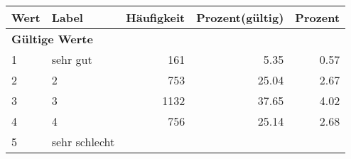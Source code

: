      \begin{longtable}{lXrrr}
     \toprule
     \textbf{Wert} & \textbf{Label} & \textbf{Häufigkeit} & \textbf{Prozent(gültig)} & \textbf{Prozent} \\
     \endhead
     \midrule
     \multicolumn{5}{l}{\textbf{Gültige Werte}}\\

     1 &
     \multicolumn{1}{X}{ sehr gut   } &


       \num{161} &
       \num[round-mode=places,round-precision=2]{5,35} &
         \num[round-mode=places,round-precision=2]{0,57} \\

     2 &
     \multicolumn{1}{X}{ 2   } &


       \num{753} &
       \num[round-mode=places,round-precision=2]{25,04} &
         \num[round-mode=places,round-precision=2]{2,67} \\

     3 &
     \multicolumn{1}{X}{ 3   } &


       \num{1132} &
       \num[round-mode=places,round-precision=2]{37,65} &
         \num[round-mode=places,round-precision=2]{4,02} \\

     4 &
     \multicolumn{1}{X}{ 4   } &


       \num{756} &
       \num[round-mode=places,round-precision=2]{25,14} &
         \num[round-mode=places,round-precision=2]{2,68} \\

     5 &
     \multicolumn{1}{X}{ sehr schlecht   } &



\end{longtable}

